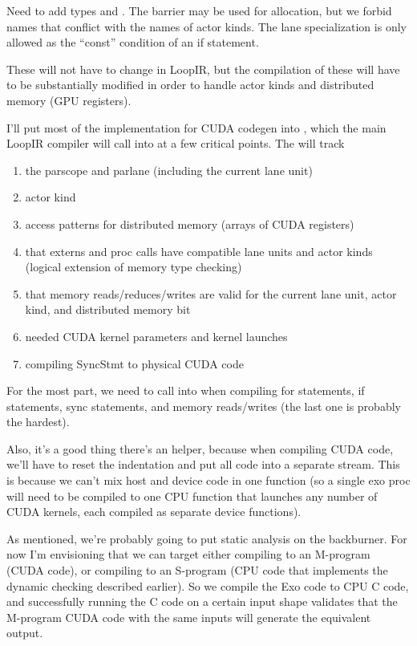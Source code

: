 \filbreak
{} Need to add types  and .
The barrier may be used for allocation, but we forbid names that conflict with the names of actor kinds.
The lane specialization is only allowed as the ``const'' condition of an if statement.

\filbreak
{} These will not have to change in LoopIR, but the compilation of these will have to be substantially modified in order to handle actor kinds and distributed memory (GPU registers).

\filbreak
{}

I'll put most of the implementation for CUDA codegen into , which the main LoopIR compiler will call into at a few critical points.
The  will track
\begin{enumerate}
  \item the parscope and parlane (including the current lane unit)
  \item actor kind
  \item access patterns for distributed memory (arrays of CUDA registers)
  \item that externs and proc calls have compatible lane units and actor kinds (logical extension of memory type checking)
  \item that memory reads/reduces/writes are valid for the current lane unit, actor kind, and distributed memory bit
  \item needed CUDA kernel parameters and kernel launches
  \item compiling SyncStmt to physical CUDA code
\end{enumerate}

\filbreak
For the most part, we need to call into  when compiling for statements, if statements, sync statements, and memory reads/writes (the last one is probably the hardest).

\filbreak
Also, it's a good thing there's an  helper, because when compiling CUDA code, we'll have to reset the indentation and put all code into a separate stream.
This is because we can't mix host and device code in one function (so a single exo proc will need to be compiled to one CPU function that launches any number of CUDA kernels, each compiled as separate device functions).

\filbreak
{}

As mentioned, we're probably going to put static analysis on the backburner.
For now I'm envisioning that we can target either compiling to an M-program (CUDA code), or compiling to an S-program (CPU code that implements the dynamic checking described earlier).
So we compile the Exo code to CPU C code, and successfully running the C code on a certain input shape validates that the M-program CUDA code with the same inputs will generate the equivalent output.

